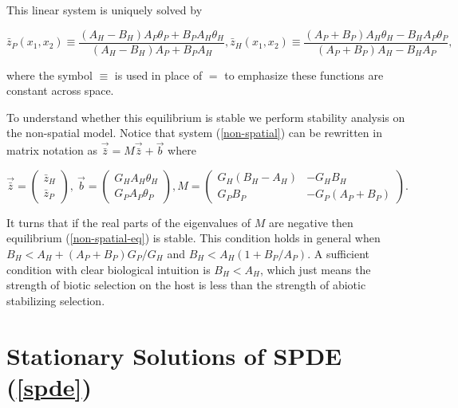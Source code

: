 \documentclass{article}
\begin{document}
This linear system is uniquely solved by

\begin{subequations}\label{non-spatial-eq}
  \begin{equation}
    \bar z_P(x_1,x_2)\equiv\frac{(A_H-B_H)A_P\theta_P+B_PA_H\theta_H}{(A_H-B_H)A_P+B_PA_H},
  \end{equation}
  \begin{equation}
    \bar z_H(x_1,x_2)\equiv\frac{(A_P+B_P)A_H\theta_H-B_HA_P\theta_P}{(A_P+B_P)A_H-B_HA_P},
  \end{equation}
\end{subequations}

where the symbol \(\equiv\) is used in place of \(=\) to emphasize these
functions are constant across space.

To understand whether this equilibrium is stable we perform stability
analysis on the non-spatial model. Notice that system
(\ref{non-spatial}) can be rewritten in matrix notation as
\(\vec{\bar z}=M\vec{\bar z}+\vec b\) where

\begin{subequations}
  \begin{equation}
    \vec{\bar z}=\left(\begin{matrix}
      \bar z_H \\ \bar z_P
    \end{matrix}\right), \ 
    \vec b =\left(\begin{matrix}
      G_HA_H\theta_H \\ G_PA_P\theta_P
    \end{matrix}\right),
  \end{equation}
  \begin{equation}
    M=\left(\begin{matrix}
      G_H(B_H-A_H) & -G_HB_H \\
      G_PB_P & -G_P(A_P+B_P)
    \end{matrix}\right).
  \end{equation}
\end{subequations}

It turns that if the real parts of the eigenvalues of \(M\) are negative
then equilibrium (\ref{non-spatial-eq}) is stable. This condition holds
in general when \(B_H<A_H+(A_P+B_P)G_P/G_H\) and \(B_H<A_H(1+B_P/A_P)\).
A sufficient condition with clear biological intuition is \(B_H<A_H\),
which just means the strength of biotic selection on the host is less
than the strength of abiotic stabilizing selection.

\hypertarget{stationary-solutions-of-spde}{%
\section{\texorpdfstring{Stationary Solutions of SPDE
(\ref{spde})}{Stationary Solutions of SPDE ()}}\label{stationary-solutions-of-spde}}



\end{document}
